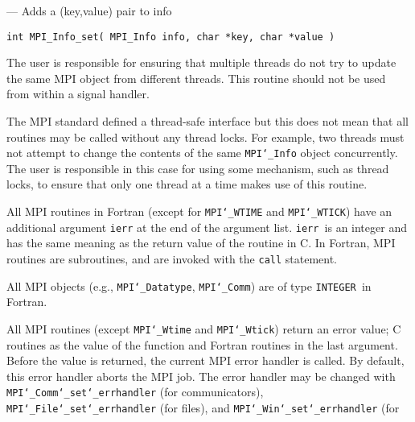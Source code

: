 \startmanpage
{}
--- Adds a (key,value) pair to info 
\startvb\begin{verbatim}
int MPI_Info_set( MPI_Info info, char *key, char *value )

\end{verbatim}
\endvb

\par
{}
\par
The user is responsible for ensuring that multiple threads do not try to
update the same MPI object from different threads.  This routine should
not be used from within a signal handler.
\par
The MPI standard defined a thread-safe interface but this does not
mean that all routines may be called without any thread locks.  For
example, two threads must not attempt to change the contents of the
same {\tt MPI{\tt \char`\_}Info} object concurrently.  The user is responsible in this
case for using some mechanism, such as thread locks, to ensure that
only one thread at a time makes use of this routine.
\par
{}
All MPI routines in Fortran (except for {\tt MPI{\tt \char`\_}WTIME} and {\tt MPI{\tt \char`\_}WTICK}) have
an additional argument {\tt ierr} at the end of the argument list.  {\tt ierr
}is an integer and has the same meaning as the return value of the routine
in C.  In Fortran, MPI routines are subroutines, and are invoked with the
{\tt call} statement.
\par
All MPI objects (e.g., {\tt MPI{\tt \char`\_}Datatype}, {\tt MPI{\tt \char`\_}Comm}) are of type {\tt INTEGER
}in Fortran.
\par
{}
\par
All MPI routines (except {\tt MPI{\tt \char`\_}Wtime} and {\tt MPI{\tt \char`\_}Wtick}) return an error value;
C routines as the value of the function and Fortran routines in the last
argument.  Before the value is returned, the current MPI error handler is
called.  By default, this error handler aborts the MPI job.  The error handler
may be changed with {\tt MPI{\tt \char`\_}Comm{\tt \char`\_}set{\tt \char`\_}errhandler} (for communicators),
{\tt MPI{\tt \char`\_}File{\tt \char`\_}set{\tt \char`\_}errhandler} (for files), and {\tt MPI{\tt \char`\_}Win{\tt \char`\_}set{\tt \char`\_}errhandler} (for
